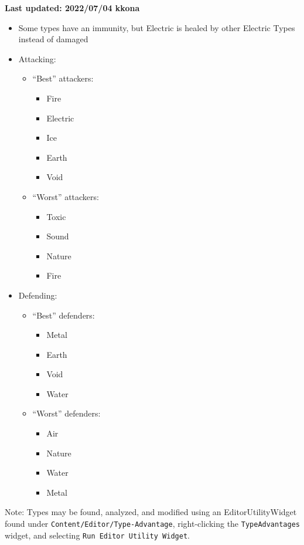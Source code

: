 

\textbf{\color{red}Last updated: 2022/07/04 kkona}

\begin{tldr}
	\begin{itemize}
		\item{Some types have an immunity, but Electric is healed by other Electric Types instead of damaged}
		\item{Attacking:
			\begin{itemize}
				\item{``Best'' attackers:
					\begin{itemize}
						\item{Fire}
						\item{Electric}
						\item{Ice}
						\item{Earth}
						\item{Void}
					\end{itemize}
				}
				\item{``Worst'' attackers:
					\begin{itemize}
						\item{Toxic}
						\item{Sound}
						\item{Nature}
						\item{Fire}
					\end{itemize}
				}
			\end{itemize}
			}
		\item{Defending:
			\begin{itemize}
				\item{``Best'' defenders:
					\begin{itemize}
						\item{Metal}
						\item{Earth}
						\item{Void}
						\item{Water}
					\end{itemize}
				}
				\item{``Worst'' defenders:
					\begin{itemize}
						\item{Air}
						\item{Nature}
						\item{Water}
						\item{Metal}
					\end{itemize}
				}
			\end{itemize}
		}
	\end{itemize}
	Note: Types may be found, analyzed, and modified using an EditorUtilityWidget found under \texttt{Content/Editor/Type-Advantage}, right-clicking the \texttt{TypeAdvantages} widget, and selecting \texttt{Run Editor Utility Widget}.
\end{tldr}

